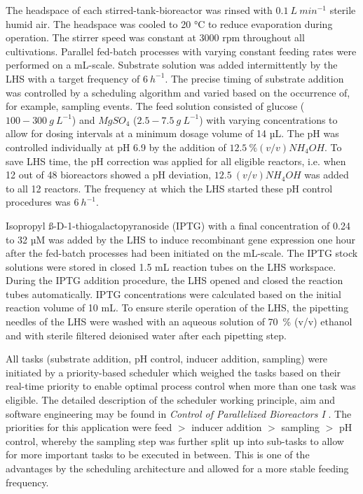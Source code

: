\documentclass[sn-standardnature]{sn-jnl}%
\theoremstyle{thmstyleone}%
\theoremstyle{thmstyletwo}%
\theoremstyle{thmstylethree}%
\begin{document}
The headspace of each stirred-tank-bioreactor was rinsed with $0.1\ L\ min^{-1}$ sterile humid air.
The headspace was cooled to 20 °C to reduce evaporation during operation.
The stirrer speed was constant at 3000 rpm throughout all cultivations.
Parallel fed-batch processes with varying constant feeding rates were performed on a mL-scale.
Substrate solution was added intermittently by the LHS with a target frequency of $6\ h^{-1}$.
The precise timing of substrate addition was controlled by a scheduling algorithm and varied based on the occurrence of, for example, sampling events.
The feed solution consisted of glucose ($100 - 300\ g\ L^{-1}$) and $MgSO_{4}$ ($2.5 - 7.5\ g\ L^{-1}$) with varying concentrations to allow for dosing intervals at a minimum dosage volume of 14 µL.
The pH was controlled individually at pH 6.9 by the addition of $12.5\ \% (v/v) NH_{4}OH$.
To save LHS time, the pH correction was applied for all eligible reactors, i.e. when 12 out of 48 bioreactors showed a pH deviation, $12.5\ (v/v) NH_{4}OH$ was added to all 12 reactors.
The frequency at which the LHS started these pH control procedures was $6\ h^{-1}$.

Isopropyl ß-D-1-thiogalactopyranoside (IPTG) with a final concentration of 0.24 to 32 µM was added by the LHS to induce recombinant gene expression one hour after the fed-batch processes had been initiated on the mL-scale.
The IPTG stock solutions were stored in closed 1.5 mL reaction tubes on the LHS workspace.
During the IPTG addition procedure, the LHS opened and closed the reaction tubes automatically.
IPTG concentrations were calculated based on the initial reaction volume of 10 mL.
To ensure sterile operation of the LHS, the pipetting needles of the LHS were washed with an aqueous solution of 70~\% (v/v) ethanol and with sterile filtered deionised water after each pipetting step.

All tasks (substrate addition, pH control, inducer addition, sampling) were initiated by a priority-based scheduler which weighed the tasks based on their real-time priority to enable optimal process control when more than one task was eligible.
The detailed description of the scheduler working principle, aim and software engineering may be found in \textit{Control of Parallelized Bioreactors I} \cite{controlOfParallelizedBioreactorsI}.
The priorities for this application were feed $>$ inducer addition $>$ sampling $>$ pH control, whereby the sampling step was further split up into sub-tasks to allow for more important tasks to be executed in between.
This is one of the advantages by the scheduling architecture and allowed for a more stable feeding frequency.
\end{document}
